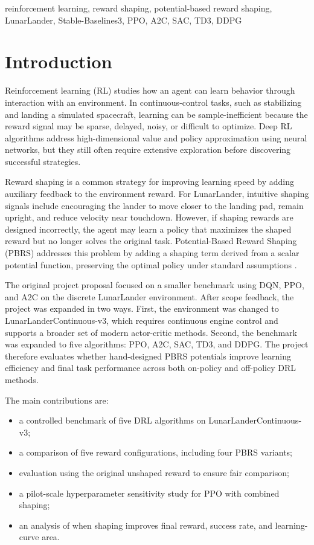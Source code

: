 \documentclass[conference,10pt]{IEEEtran}
\begin{document}
\begin{IEEEkeywords}
reinforcement learning, reward shaping, potential-based reward shaping, LunarLander, Stable-Baselines3, PPO, A2C, SAC, TD3, DDPG
\end{IEEEkeywords}

\section{Introduction}
Reinforcement learning (RL) studies how an agent can learn behavior through interaction with an environment. In continuous-control tasks, such as stabilizing and landing a simulated spacecraft, learning can be sample-inefficient because the reward signal may be sparse, delayed, noisy, or difficult to optimize. Deep RL algorithms address high-dimensional value and policy approximation using neural networks, but they still often require extensive exploration before discovering successful strategies.

Reward shaping is a common strategy for improving learning speed by adding auxiliary feedback to the environment reward. For LunarLander, intuitive shaping signals include encouraging the lander to move closer to the landing pad, remain upright, and reduce velocity near touchdown. However, if shaping rewards are designed incorrectly, the agent may learn a policy that maximizes the shaped reward but no longer solves the original task. Potential-Based Reward Shaping (PBRS) addresses this problem by adding a shaping term derived from a scalar potential function, preserving the optimal policy under standard assumptions \cite{ng1999policy}.

The original project proposal focused on a smaller benchmark using DQN, PPO, and A2C on the discrete LunarLander environment. After scope feedback, the project was expanded in two ways. First, the environment was changed to LunarLanderContinuous-v3, which requires continuous engine control and supports a broader set of modern actor-critic methods. Second, the benchmark was expanded to five algorithms: PPO, A2C, SAC, TD3, and DDPG. The project therefore evaluates whether hand-designed PBRS potentials improve learning efficiency and final task performance across both on-policy and off-policy DRL methods.

The main contributions are:
\begin{itemize}
    \item a controlled benchmark of five DRL algorithms on LunarLanderContinuous-v3;
    \item a comparison of five reward configurations, including four PBRS variants;
    \item evaluation using the original unshaped reward to ensure fair comparison;
    \item a pilot-scale hyperparameter sensitivity study for PPO with combined shaping;
    \item an analysis of when shaping improves final reward, success rate, and learning-curve area.
\end{itemize}
\end{document}
